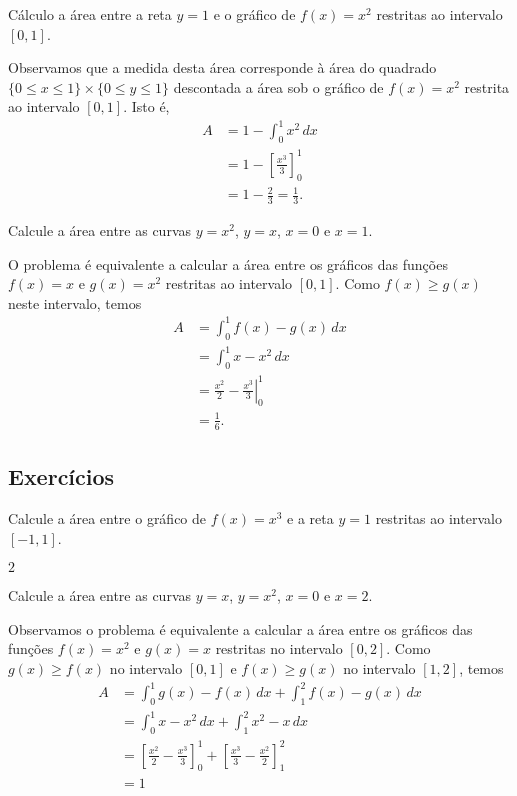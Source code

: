\begin{exeresol}
  Cálculo a área entre a reta $y=1$ e o gráfico de $f(x)=x^2$ restritas ao intervalo $[0,1]$.
\end{exeresol}
\begin{resol}
  Observamos que a medida desta área corresponde à área do quadrado $\{0\leq x \leq 1\}\times \{0\leq y \leq 1\}$ descontada a área sob o gráfico de $f(x)=x^2$ restrita ao intervalo $[0,1]$. Isto é,
  \begin{align}
    A &= 1 - \int_0^1 x^2\,dx\\
      &= 1 - \left[\frac{x^3}{3}\right]_0^1\\
      &= 1 - \frac{2}{3} = \frac{1}{3}.
  \end{align}
\end{resol}

\begin{exeresol}
  Calcule a área entre as curvas $y=x^2$, $y=x$, $x=0$ e $x=1$.
\end{exeresol}
\begin{resol}
  O problema é equivalente a calcular a área entre os gráficos das funções $f(x)=x$ e $g(x)=x^2$ restritas ao intervalo $[0,1]$. Como $f(x)\geq g(x)$ neste intervalo, temos
  \begin{align}
    A &= \int_0^1 f(x)-g(x)\,dx\\
      &= \int_0^1 x-x^2\,dx\\
      &= \left.\frac{x^2}{2}-\frac{x^3}{3}\right|_0^1\\
      &= \frac{1}{6}.
  \end{align}
\end{resol}

\emconstrucao

\subsection*{Exercícios}

\begin{exer}
  Calcule a área entre o gráfico de $f(x)=x^3$ e a reta $y=1$ restritas ao intervalo $[-1,1]$.
\end{exer}
\begin{resp}
  $2$
\end{resp}

\begin{exer}
  Calcule a área entre as curvas $y=x$, $y=x^2$, $x=0$ e $x=2$.
\end{exer}
\begin{resp}
  Observamos o problema é equivalente a calcular a área entre os gráficos das funções $f(x)=x^2$ e $g(x)=x$ restritas no intervalo $[0,2]$. Como $g(x)\geq f(x)$ no intervalo $[0,1]$ e $f(x)\geq g(x)$ no intervalo $[1,2]$, temos
  \begin{align}
    A &= \int_0^1 g(x)-f(x)\,dx + \int_1^2 f(x)-g(x)\,dx\\
      &= \int_0^1 x-x^2\,dx + \int_1^2 x^2-x\,dx\\
      &= \left[\frac{x^2}{2}-\frac{x^3}{3}\right]_0^1 + \left[\frac{x^3}{3}-\frac{x^2}{2}\right]_1^2\\
      &= 1
  \end{align}
\end{resp}

